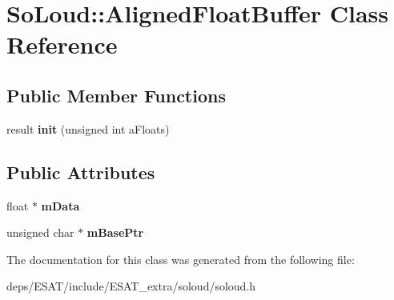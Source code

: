 \hypertarget{class_so_loud_1_1_aligned_float_buffer}{}\section{So\+Loud\+:\+:Aligned\+Float\+Buffer Class Reference}
\label{class_so_loud_1_1_aligned_float_buffer}
\subsection*{Public Member Functions}
\begin{DoxyCompactItemize}
\item 
\mbox{\label{class_so_loud_1_1_aligned_float_buffer_a163449d57904aa8b61afc579e6ef85aa}} 
result {\bfseries init} (unsigned int a\+Floats)
\end{DoxyCompactItemize}
\subsection*{Public Attributes}
\begin{DoxyCompactItemize}
\item 
\mbox{\label{class_so_loud_1_1_aligned_float_buffer_a0e9b2b694e1d84c8c93082573be75659}} 
float $\ast$ {\bfseries m\+Data}
\item 
\mbox{\label{class_so_loud_1_1_aligned_float_buffer_a7e39207aaaf50586a6a128cd4fdefe5b}} 
unsigned char $\ast$ {\bfseries m\+Base\+Ptr}
\end{DoxyCompactItemize}


The documentation for this class was generated from the following file\+:\begin{DoxyCompactItemize}
\item 
deps/\+E\+S\+A\+T/include/\+E\+S\+A\+T\+\_\+extra/soloud/soloud.\+h\end{DoxyCompactItemize}
